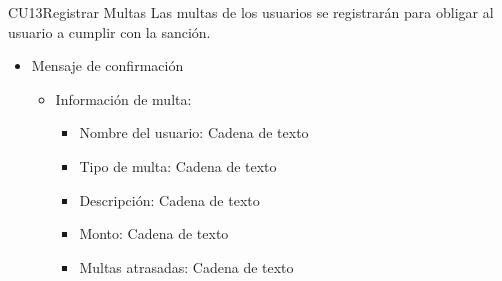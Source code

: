 \begin{UseCase}{CU13}{Registrar Multas}{
	Las multas de los usuarios se registrarán para obligar al usuario a cumplir con la sanción.
	}
{\begin{itemize}
\begin{itemize}
\begin{itemize}
	    		    		\item Fecha de límite de cumplimiento: Fecha en formato dd/mm/yyyy
	        			\end{itemize}
	     		   \end{itemize}
	        	   \item Mensaje de confirmación
	        	   \begin{itemize}
	        			\item Información de multa:
	        			\begin{itemize}
	        				\item Nombre del usuario: Cadena de texto
	        				\item Tipo de multa: Cadena de texto
		        			\item Descripción: Cadena de texto
		        			\item Monto: Cadena de texto
	    	    			\item Multas atrasadas: Cadena de texto
	        			\end{itemize}
	        		\end{itemize}
	    		\end{itemize}		
		}
	\end{UseCase}
